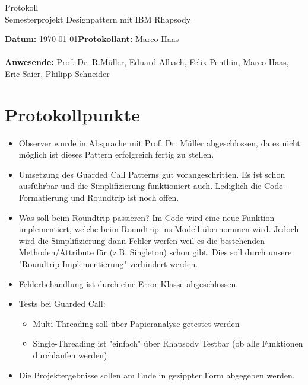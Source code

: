 \documentclass[a4paper]{article}
\begin{document}
\begin{center}
{\Huge Protokoll}\\
{\large Semesterprojekt Designpattern mit IBM Rhapsody}\\
\end{center}
\vspace*{10mm}
\textbf{Datum:} \today \hfill \textbf{Protokollant:} Marco Haas\\
\\
\textbf{Anwesende:} Prof. Dr. R.Müller, Eduard Albach, Felix Penthin, Marco Haas, Eric Saier, Philipp Schneider\\
\section*{Protokollpunkte}
 \begin{itemize}
      \item Observer wurde in Absprache mit Prof. Dr. Müller abgeschlossen, da es 
      		nicht möglich ist dieses Pattern erfolgreich fertig zu stellen.
      \item Umsetzung des Guarded Call Patterns gut vorangeschritten. Es ist schon 	ausführbar und die Simplifizierung funktioniert auch. Lediglich die Code-Formatierung und Roundtrip ist noch offen.
      \item Was soll beim Roundtrip passieren? Im Code wird eine neue Funktion implementiert, welche beim Roundtrip ins Modell übernommen wird. Jedoch wird die Simplifizierung dann Fehler werfen weil es die bestehenden Methoden/Attribute für (z.B. Singleton) schon gibt. Dies soll durch unsere "Roundtrip-Implementierung" verhindert werden.
      \item Fehlerbehandlung ist durch eine Error-Klasse abgeschlossen.
      \item Tests bei Guarded Call:
      		\begin{itemize}
      			\item Multi-Threading soll über Papieranalyse getestet werden
      			\item Single-Threading ist "einfach" über Rhapsody Testbar (ob alle Funktionen durchlaufen werden)
      		\end{itemize}
      \item Die Projektergebnisse sollen am Ende in gezippter Form abgegeben werden.
   \end{itemize}
\end{document}
